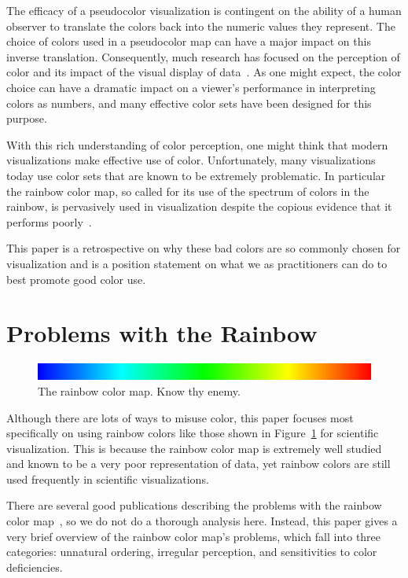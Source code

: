 \documentclass[letterpaper,twocolumn,fleqn]{article}
\newcommand*{\lcite}[1]{~\cite{#1}}
\begin{document}
The efficacy of a pseudocolor visualization is contingent on the ability of
a human observer to translate the colors back into the numeric values they
represent. The choice of colors used in a pseudocolor map can have a major
impact on this inverse translation. Consequently, much research has focused
on the perception of color and its impact of the visual display of
data\lcite{Brewer2005,Ware1988,Rheingans1999,Rogowitz1996,Silva2011}. As
one might expect, the color choice can have a dramatic impact on a viewer's
performance in interpreting colors as numbers, and many effective color
sets have been designed for this purpose.

With this rich understanding of color perception, one might think that
modern visualizations make effective use of color. Unfortunately, many
visualizations today use color sets that are known to be extremely
problematic. In particular the rainbow color map, so called for its use of
the spectrum of colors in the rainbow, is pervasively used in visualization
despite the copious evidence that it performs
poorly\lcite{Borland2007,Rogowitz1996,Rogowitz1998,Rheingans1999,Light2004,Ware2004}.

This paper is a retrospective on why these bad colors are so commonly
chosen for visualization and is a position statement on what we as
practitioners can do to best promote good color use.


\section{Problems with the Rainbow}

\begin{figure}[htb]
  \centering
  \includegraphics[width=.9\linewidth]{images/RainbowBar}
  \caption{The rainbow color map. Know thy enemy.}
  \label{fig:Rainbow}
\end{figure}

\noindent
Although there are lots of ways to misuse color, this paper focuses most
specifically on using rainbow colors like those shown in
Figure~\ref{fig:Rainbow} for scientific visualization. This is because the
rainbow color map is extremely well studied and known to be a very poor
representation of data, yet rainbow colors are still used frequently in
scientific visualizations.

There are several good publications describing the problems with the
rainbow color map\lcite{Borland2007,Light2004,Rogowitz1998}, so we do not
do a thorough analysis here. Instead, this paper gives a very brief
overview of the rainbow color map's problems, which fall into three
categories: unnatural ordering, irregular perception, and sensitivities to
color deficiencies.
\end{document}

